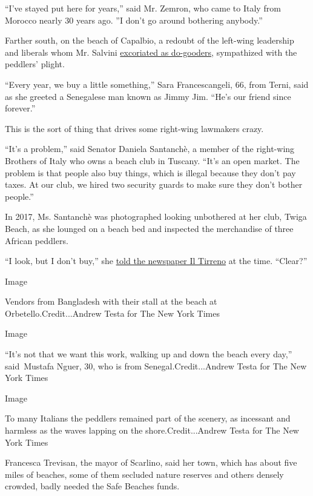 ``I've stayed put here for years,'' said Mr. Zemron, who came to Italy
from Morocco nearly 30 years ago. ''I don't go around bothering
anybody.''

Farther south, on the beach of Capalbio, a redoubt of the left-wing
leadership and liberals whom Mr. Salvini
\href{https://www.nytimes3xbfgragh.onion/2019/04/13/world/europe/italy-do-gooders-buonisti-matteo-salvini.html}{excoriated
as do-gooders}, sympathized with the peddlers' plight.

``Every year, we buy a little something,'' Sara Francescangeli, 66, from
Terni, said as she greeted a Senegalese man known as Jimmy Jim. ``He's
our friend since forever.''

This is the sort of thing that drives some right-wing lawmakers crazy.

``It's a problem,'' said Senator Daniela Santanchè, a member of the
right-wing Brothers of Italy who owns a beach club in Tuscany. ``It's an
open market. The problem is that people also buy things, which is
illegal because they don't pay taxes. At our club, we hired two security
guards to make sure they don't bother people.''

In 2017, Ms. Santanchè was photographed looking unbothered at her club,
Twiga Beach, as she lounged on a beach bed and inspected the merchandise
of three African peddlers.

``I look, but I don't buy,'' she
\href{https://iltirreno.gelocal.it/versilia/cronaca/2017/08/10/news/daniela-santanche-e-la-venditrice-sulla-spiaggia-guardo-ma-non-compro-1.15718229?refresh_ce}{told
the newspaper Il Tirreno} at the time. ``Clear?''

Image

Vendors from Bangladesh with their stall at the beach at
Orbetello.Credit...Andrew Testa for The New York Times

Image

``It's not that we want this work, walking up and down the beach every
day,'' said~Mustafa Nguer, 30, who is from Senegal.Credit...Andrew Testa
for The New York Times

Image

To many Italians the peddlers remained part of the scenery, as incessant
and harmless as the waves lapping on the shore.Credit...Andrew Testa for
The New York Times

Francesca Trevisan, the mayor of Scarlino, said her town, which has
about five miles of beaches, some of them secluded nature reserves and
others densely crowded, badly needed the Safe Beaches funds.

